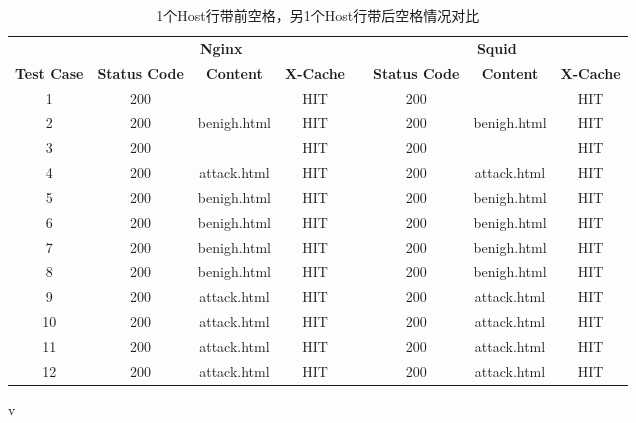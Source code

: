 \begin{table}
	\renewcommand\arraystretch{1.1}      %
	\caption{1个Host行带前空格，另1个Host行带后空格情况对比}
	\vspace{1.2mm}                  %
	\centering                            %
	{\tabcolsep  0.05in                    %
		\begin{tabular}{cccccccc}
			\hline
			& \multicolumn{3}{c}{\textbf{Nginx}} & & \multicolumn{3}{c}{\textbf{Squid}}\\
			\cline{2-4}\cline{6-8}
			\textbf{Test Case}& \textbf{Status Code} & \textbf{Content}  & \textbf{X-Cache}  & &  \textbf{Status Code}  & \textbf{Content} & \textbf{X-Cache}\\
			\hline
			1 &   200  &  {\color{red}{attack.html}}  &  HIT  & &  200  &  {\color{red}{benigh.html}}  &  HIT \\
			2 &  200 &   benigh.html &  HIT  & &  200  &  benigh.html  &  HIT \\
			3 &  200  &  {\color{red}{benigh.html}} &  HIT  & &  200  &  {\color{red}{attack.html}}   &  HIT \\
			4 &  200 &  attack.html &  HIT      & &  200 & attack.html   &  HIT \\
			5 &  200 &  benigh.html  &  HIT  & &  200 &  benigh.html  &  HIT \\
			6 &  200 &  benigh.html  &  HIT     & &  200 & benigh.html     &  HIT \\
			7 &   200  &  benigh.html  &  HIT  & &  200  &  benigh.html  &  HIT \\
			8 &  200 &  benigh.html  &  HIT  & &  200  &  benigh.html  &  HIT \\
			9 &  200  &  attack.html &  HIT  & &  200  &  attack.html  &  HIT \\
			10 &  200 &  attack.html&  HIT      & &  200 & attack.html   &  HIT \\
			11 &  200 &  attack.html  &  HIT  & &  200 &  attack.html  &  HIT \\
			12 &  200 &  attack.html  &  HIT     & &  200 & attack.html     &  HIT \\
			\hline
		\end{tabular}
	}
\end{table}v
{\color{red}{400}}
